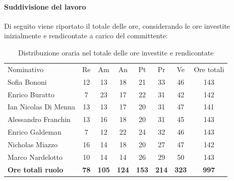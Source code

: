 \documentclass[../piano-di-progetto.tex]{subfiles}
\begin{document}
  \paragraph{Suddivisione del lavoro}
  Di seguito viene riportato il totale delle ore, considerando le ore investite inizialmente e rendicontate a carico del committente:
  \begin{table}[H]
    \centering
    \begin{tabular}{lccccccc}
    Nominativo                & Re          & Am           & An           & Pt           & Pr           & Ve           & Ore totali   \\
    Sofia Bononi              & 12          & 13           & 18           & 21           & 33           & 46           & 143          \\
    Enrico Buratto            & 7           & 23           & 17           & 22           & 31           & 42           & 142          \\
    Ian Nicolas Di Menna      & 13          & 13           & 17           & 20           & 31           & 47           & 141          \\
    Alessandro Franchin       & 13          & 16           & 18           & 20           & 31           & 45           & 143          \\
    Enrico Galdeman           & 7           & 12           & 22           & 24           & 32           & 46           & 143          \\
    Nicholas Miazzo           & 16          & 14           & 18           & 20           & 27           & 47           & 142          \\
    Marco Nardelotto          & 10          & 14           & 14           & 26           & 29           & 50           & 143          \\
    \textbf{Ore totali ruolo} & \textbf{78} & \textbf{105} & \textbf{124} & \textbf{153} & \textbf{214} & \textbf{323} & \textbf{997}
    \end{tabular}
    \caption{Distribuzione oraria nel totale delle ore investite e rendicontate}
    \end{table}
\end{document}
